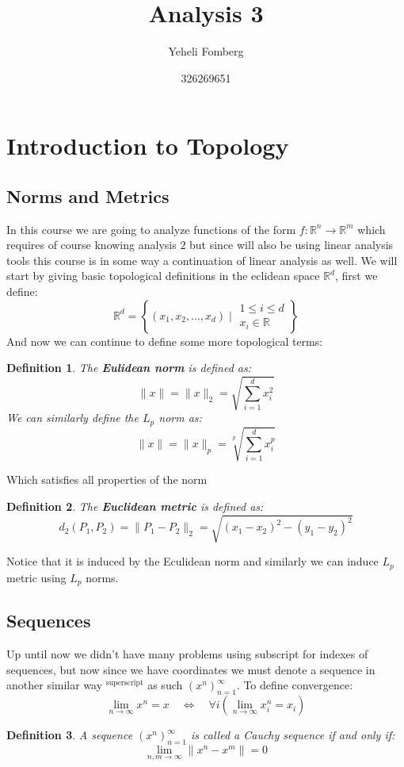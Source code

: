 \documentclass[11pt,a4paper]{article}
\title{\textbf{Analysis 3}}
\author{Yeheli Fomberg}
\date{326269651}
\theoremstyle{plain}
\newtheorem{definition}{Definition}[section]
\newcommand{\R}{\mathbb{R}}
\newcommand{\set}[2]{ \left\{ #1 \mid #2 \right\} }
\begin{document}
	\maketitle
	\newpage
	\section{Introduction to Topology}
	\subsection{Norms and Metrics}
	In this course we are going to analyze functions of the form 
	$f\colon \R^n\to\R^m$ which requires of course knowing analysis $2$ but
	since will also be using linear analysis tools this course is in
	some way a continuation of linear analysis as well. We will
	start by giving basic topological definitions in the eclidean
	space $\R^d$, first we define:
	\[
		\R^d = \set{(x_1,x_2,\dots,x_d)}{\substack{1 \le i \le d \\ x_i\in\R}}
	\]
	And now we can continue to define some more topological terms:
	\begin{definition}
	The \textbf{Eulidean norm} is defined as:
	\[
		\|x\| = \|x\|_2 = \sqrt{\sum_{i=1}^{d}{x_i^2}}
	\]
	We can similarly define the $L_p$ norm as:
	\[
		\|x\| = \|x\|_p = \sqrt[p]{\sum_{i=1}^{d}{x_i^p}}
	\]
	\end{definition}
	\noindent Which satisfies all properties of the norm
	\begin{definition}
	The \textbf{Euclidean metric} is defined as:
	\[
		d_2(P_1,P_2) = \|P_1-P_2\|_2 = \sqrt{(x_1-x_2)^2 - (y_1-y_2)^2}
	\]
	\end{definition}
	\noindent Notice that it is induced by the Eculidean norm and similarly
	we can induce $L_p$ metric using $L_p$ norms.
	\subsection{Sequences}
	Up until now we didn't have many problems using subscript for indexes
	of sequences, but now since we have coordinates we must denote a sequence
	in another similar way $^{\text{superscript}}$ as such 
	$(x^n)_{n=1}^{\infty}$. To define convergence:
	\[
		\lim_{n\to\infty}{x^n} = x 
		\quad \iff \quad
		\forall i\left(\lim_{n\to\infty}{x_i^n} = x_i\right)
	\]
	\begin{definition}
	A sequence $(x^n)_{n=1}^{\infty}$ is called a Cauchy sequence if and only 
	if:
	\[
		\lim_{n,m\to\infty}{\|x^n-x^m\|} = 0
	\]
	\end{definition}
	
\end{document}
